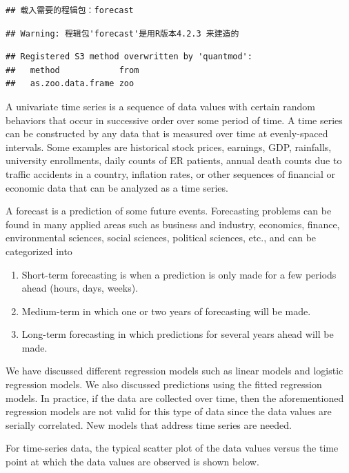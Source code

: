 \documentclass[
]{book}
\begin{document}
\begin{verbatim}
## 载入需要的程辑包：forecast
\end{verbatim}

\begin{verbatim}
## Warning: 程辑包'forecast'是用R版本4.2.3 来建造的
\end{verbatim}

\begin{verbatim}
## Registered S3 method overwritten by 'quantmod':
##   method            from
##   as.zoo.data.frame zoo
\end{verbatim}

A univariate time series is a sequence of data values with certain random behaviors that occur in successive order over some period of time. A time series can be constructed by any data that is measured over time at evenly-spaced intervals. Some examples are historical stock prices, earnings, GDP, rainfalls, university enrollments, daily counts of ER patients, annual death counts due to traffic accidents in a country, inflation rates, or other sequences of financial or economic data that can be analyzed as a time series.

A forecast is a prediction of some future events. Forecasting problems can be found in many applied areas such as business and industry, economics, finance, environmental sciences, social sciences, political sciences, etc., and can be categorized into

\begin{enumerate}
\def\labelenumi{\arabic{enumi}.}
\item
  Short-term forecasting is when a prediction is only made for a few periods ahead (hours, days, weeks).
\item
  Medium-term in which one or two years of forecasting will be made.
\item
  Long-term forecasting in which predictions for several years ahead will be made.
\end{enumerate}

We have discussed different regression models such as linear models and logistic regression models. We also discussed predictions using the fitted regression models. In practice, if the data are collected over time, then the aforementioned regression models are not valid for this type of data since the data values are serially correlated. New models that address time series are needed.

For time-series data, the typical scatter plot of the data values versus the time point at which the data values are observed is shown below.
\end{document}
